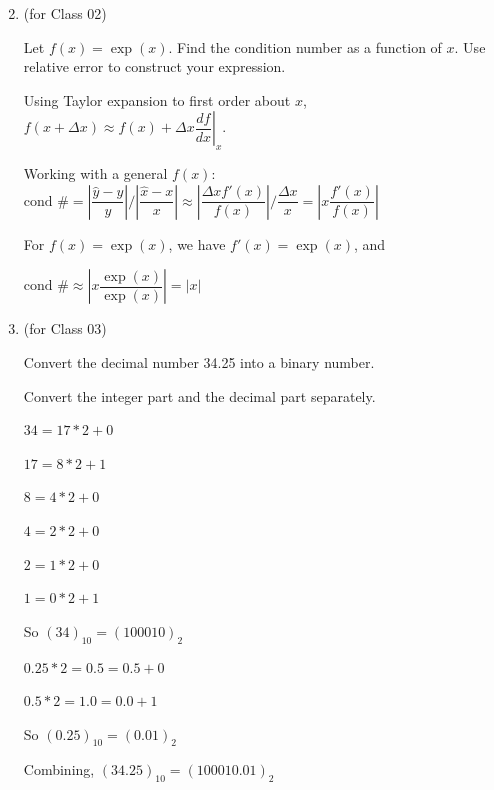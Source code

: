 \documentclass[12pt,letterpaper,answers]{exam}
\begin{document}
 \pdfpageheight 11in 
  \pdfpagewidth 8.5in

\begin{enumerate}
\setcounter{enumi}{1}
\item (for Class 02)

Let $f(x) = \exp(x)$.  Find the condition number as a function of $x$.  Use relative error to construct your expression.

\begin{solution}
Using Taylor expansion to first order about $x$, $f(x+\Delta x)\approx f(x) + \Delta x \left.\dfrac{df}{dx}\right\vert_x$.

Working with a general $f(x)$:
$\text{cond }\# = \left\vert\dfrac{\hat{y}-y}{y} \right\vert / \left\vert\dfrac{\hat{x}-x}{x} \right\vert \approx \left\vert \dfrac{\Delta xf'(x)}{f(x)} \right\vert / \dfrac{\Delta x}{x} = \left\vert x\dfrac{f'(x)}{f(x)}\right\vert$

For $f(x) = \exp(x)$, we have $f'(x) = \exp(x)$, and

$\text{cond }\# \approx \left\vert x \dfrac{\exp(x)}{\exp(x)} \right\vert  = \left\vert x \right\vert$

\end{solution}

\item (for Class 03)

Convert the decimal number 34.25 into a binary number.

\begin{solution}
    Convert the integer part and the decimal part separately.
    \begin{multicols}{2}
    
    $34 = 17*2 + 0$
    
    $17 = 8*2 + 1$
    
    $8 = 4*2 + 0$

    $4 = 2*2 + 0$

    $2 = 1*2 + 0$

    $1 = 0*2 + 1$
    
    So $(34)_{10} = (100010)_2 $
    
    \columnbreak
    
    $0.25 * 2 = 0.5 = 0.5 + 0$

    $0.5 * 2 = 1.0 = 0.0 + 1$
    
    So $(0.25)_{10} = (0.01)_2$
    
    \end{multicols}
    
    Combining, $(34.25)_{10} = (100010.01)_2$
\end{solution}


\end{enumerate}
\end{document}
